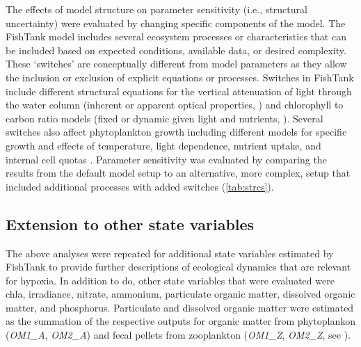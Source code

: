 \documentclass[letterpaper,12pt,oneside]{article}\usepackage[]{graphicx}\usepackage[]{color}
\begin{document}
The effects of model structure on parameter sensitivity (i.e., structural uncertainty) were evaluated by changing specific components of the model.  The FishTank model includes several ecosystem processes or characteristics that can be included based on expected conditions, available data, or desired complexity.  These `switches' are conceptually different from model parameters as they allow the inclusion or exclusion of explicit equations or processes.  Switches in FishTank include different structural equations for the vertical attenuation of light through the water column (inherent or apparent optical properties, \citealt{Penta09,Eldridge10}) and chlorophyll to carbon ratio models (fixed or dynamic given light and nutrients, \citealt{Cloern95}).  Several switches also affect phytoplankton growth including different models for specific growth and effects of temperature, light dependence, nutrient uptake, and internal cell quotas .  Parameter sensitivity was evaluated by comparing the results from the default model setup to an alternative, more complex, setup that included additional processes with added switches (\cref{tab:strcs}).  

\subsection{Extension to other state variables}

The above analyses were repeated for additional state variables estimated by FishTank to provide further descriptions of ecological dynamics that are relevant for hypoxia.  In addition to \ac{do}, other state variables that were evaluated were \ac{chla}, irradiance, nitrate, ammonium, particulate organic matter, dissolved organic matter, and phosphorus.  Particulate and dissolved organic matter were estimated as the summation of the respective outputs for organic matter from phytoplankon (\textit{OM1\_A}, \textit{OM2\_A}) and fecal pellets from zooplankton (\textit{OM1\_Z}, \textit{OM2\_Z}, see ). 
\end{document}
